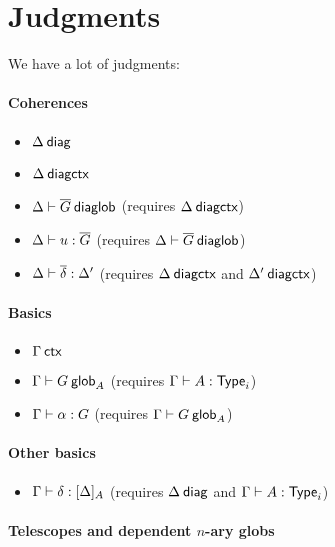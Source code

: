 \section{Judgments}

We have a lot of judgments:

\paragraph{Coherences}

\begin{itemize}
\item $\Delta \: \mathsf{diag}$
\item ${\Delta} \: \mathsf{diagctx}$
\item ${\Delta} \vdash {\ensuremath{\overline{G}}} \: \mathsf{diaglob}$ (requires ${\Delta} \: \mathsf{diagctx}$)
\item ${\Delta} \vdash {u} : {\overline{G}}$ (requires ${\Delta} \vdash {\ensuremath{\overline{G}}} \: \mathsf{diaglob}$)
\item ${\Delta} \vdash {\ensuremath{\overline{\delta}}} : {\Delta'}$ (requires ${\Delta} \: \mathsf{diagctx}$
  and ${\Delta'} \: \mathsf{diagctx}$)
\end{itemize}

\paragraph{Basics}

\begin{itemize}
\item ${\Gamma} \: \mathsf{ctx}$
\item ${\Gamma} \vdash {G} \: \mathsf{glob}_{A}$ (requires ${\Gamma} \vdash {A} : {\mathsf{Type}_{i}}$)
\item ${\Gamma} \vdash {\alpha} : {G}$ (requires ${\Gamma} \vdash {G} \: \mathsf{glob}_{A}$)
\end{itemize}

\paragraph{Other basics}

\begin{itemize}
\item ${\Gamma} \vdash {\delta} : {[ \Delta ]_{A}}$ (requires $\Delta \: \mathsf{diag}$ and
  ${\Gamma} \vdash {A} : {\mathsf{Type}_{i}}$)
\end{itemize}

\paragraph{Telescopes and dependent $n$-ary globs}

